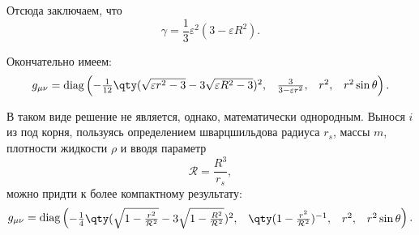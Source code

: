 \documentclass[\docroot/reports/draft/report.tex]{subfiles}
\begin{document}
    Отсюда заключаем, что
    \begin{equation}
        \gamma = \frac{1}{3} \varepsilon^2 (3 - \varepsilon R^2) .
    \end{equation}

    Окончательно имеем:
    \begin{equation}
        g_{\mu\nu} = \text{diag} \begin{pmatrix}
            - \frac{1}{12} \qty(\sqrt{\varepsilon r^2 - 3} - 3 \sqrt{\varepsilon R^2 - 3})^2,&
            \frac{3}{3 - \varepsilon r^2},&
            r^2,&
            r^2 \sin\theta
        \end{pmatrix} .
    \end{equation}

    В таком виде решение не является, однако, математически однородным. Вынося $i$ из под корня, пользуясь определением шварцшильдова радиуса $r_s$, массы $m$, плотности жидкости $\rho$ и вводя параметр
    \begin{equation*}
        \mathcal{R} = \frac{R^3}{r_s} ,
    \end{equation*}
    можно придти к более компактному результату:
    \begin{equation}
        g_{\mu\nu} = \text{diag} \begin{pmatrix}
            - \frac{1}{4} \qty(\sqrt{1 - \frac{r^2}{\mathcal{R}^2}} - 3 \sqrt{1 - \frac{R^2}{\mathcal{R}^2}})^2,&
            \qty(1 - \frac{r^2}{\mathcal{R}^2})^{-1},&
            r^2,&
            r^2 \sin\theta
        \end{pmatrix} .
    \end{equation}

\end{document}
